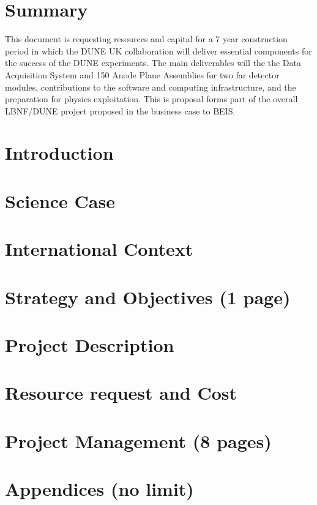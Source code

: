 \documentclass[a4paper,11pt]{article}
\begin{document}
\section*{Summary}
This document is requesting resources and capital for a 7 year construction period in which the DUNE UK collaboration will deliver essential components for the success of the DUNE experiments. The main deliverables will the the Data Acquisition System and 150 Anode Plane Assemblies for two far detector modules, contributions to the software and computing infrastructure, and the preparation for physics exploitation. This is proposal forms part of the overall LBNF/DUNE project proposed in the business case to BEIS.

\thispagestyle{empty}

\newpage
\thispagestyle{empty}
\setcounter{page}{1}

\setcounter{tocdepth}{2}
\tableofcontents
\newpage


\section{Introduction} 


\section{Science Case}


\section{International Context}


\section{Strategy and Objectives (1 page)}


\section{Project Description}





\pagebreak

\section{Resource request and Cost}


\section{Project Management (8 pages)}


\printbibliography
\clearpage


\appendix
\section*{Appendices (no limit)}
\renewcommand{\thesubsection}{\Alph{subsection}}


\end{document}
